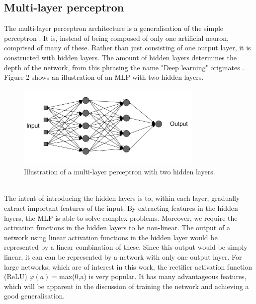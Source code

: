 \documentclass{article}
\begin{document}

\subsection{Multi-layer perceptron}
The multi-layer perceptron architecture is a generalisation of the simple perceptron \cite{Simonhaykin}. It is, instead of being composed of only one artificial neuron, comprised of many of these. Rather than just consisting of one output layer, it is constructed with hidden layers. The amount of hidden layers determines the depth of the network, from this phrasing the name "Deep learning" originates \cite{Deeplearningbook}. Figure 2 shows an illustration of an MLP with two hidden layers.
\begin{figure}[h!] 
	\centering
	\includegraphics[width=0.8\textwidth]{Multi_layer_perceptron.png}
	\caption{Illustration of a multi-layer perceptron with two hidden layers. \cite{Lecturenotes}}
	\label{fig:Multilayer-perceptron}
\end{figure}\\

The intent of introducing the hidden layers is to, within each layer, gradually extract important features of the input. By extracting features in the hidden layers, the MLP is able to solve complex problems. Moreover, we require the activation functions in the hidden layers to be non-linear. The output of a network using linear activation functions in the hidden layer would be represented by a linear combination of these. Since this output would be simply linear, it can can be represented by a network with only one output layer. For large networks, which are of interest in this work, the rectifier activation function (ReLU) $\varphi(a)=$max(0,a) is very popular. It has many advantageous features, which will be apparent in the discussion of training the network and achieving a good generalisation. %
\end{document}
